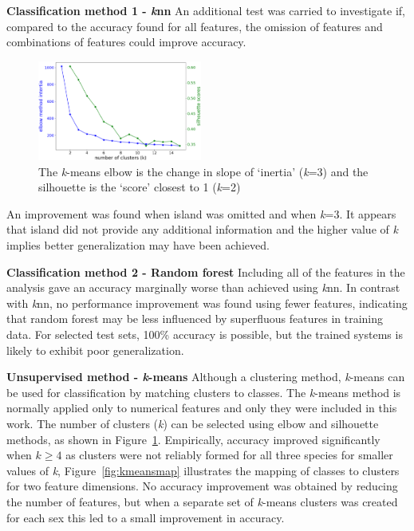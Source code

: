 \documentclass[12pt]{article}
\begin{document}
\textbf{Classification method 1 - \textit{k}nn}  
An additional test was carried to investigate if, compared to the accuracy found for all features, 
the omission of features and combinations of features could improve accuracy.
\begin{figure} %
  \centering
  \vspace{-0.5\baselineskip} %
  \includegraphics[width=0.48\textwidth]{kmeansvalue.png} %
  \vspace{-1.5\baselineskip} %
  \caption{\centering\linespread{0.8}\selectfont The \textit{k}-means elbow is the change in slope of `inertia' (\textit{k}=3)
  and the silhouette is the `score' closest to 1 (\textit{k}=2)}
  \vspace{-1\baselineskip} %
  \label{fig:kmeansvalue}
\end{figure}
An improvement was found when island was omitted and when \textit{k}=3. It appears that island did not provide 
any additional information and the higher value of \textit{k} implies better generalization may have been achieved.

\textbf{Classification method 2 - Random forest}  
Including all of the features in the analysis gave an accuracy marginally worse 
than achieved using \textit{k}nn. 
In contrast with \textit{k}nn, no performance improvement was found using fewer features, indicating that random forest
may be less influenced by superfluous features in training data. 
For selected test sets, 100\% accuracy is possible, but the trained systems is likely to exhibit poor generalization.

\textbf{Unsupervised method - \textit{k}-means}  
Although a clustering method, 
\textit{k}-means can be used for classification by matching clusters to classes. 
The \textit{k}-means method is normally applied only to numerical features and only they were included in this work. 
The number of clusters (\textit{k}) can be selected using elbow and silhouette methods, 
as shown in Figure~\ref{fig:kmeansvalue}. Empirically, accuracy improved significantly when \(k \geq 4\)
as clusters were not reliably formed for all three species for smaller values of \textit{k},  
Figure~\ref{fig:kmeansmap} illustrates the mapping of classes to clusters for two feature dimensions. 
No accuracy improvement was obtained by reducing the number of features, 
but when a separate set of \textit{k}-means clusters was created for each sex 
this led to a small improvement in accuracy. 
\end{document}
